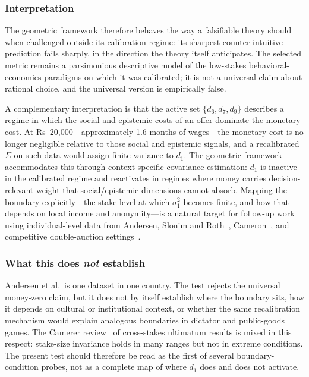 \documentclass[journal]{IEEEtran}
\begin{document}
\subsubsection{Interpretation}
The geometric framework therefore behaves the way a falsifiable theory should when challenged outside its calibration regime: its sharpest counter-intuitive prediction fails sharply, in the direction the theory itself anticipates.
The selected metric remains a parsimonious descriptive model of the low-stakes behavioral-economics paradigms on which it was calibrated; it is not a universal claim about rational choice, and the universal version is empirically false.

A complementary interpretation is that the active set $\{d_6,d_7,d_9\}$ describes a regime in which the social and epistemic costs of an offer dominate the monetary cost.
At Rs~20{,}000---approximately 1.6 months of wages---the monetary cost is no longer negligible relative to those social and epistemic signals, and a recalibrated $\Sigma$ on such data would assign finite variance to $d_1$.
The geometric framework accommodates this through context-specific covariance estimation: $d_1$ is inactive in the calibrated regime and reactivates in regimes where money carries decision-relevant weight that social/epistemic dimensions cannot absorb.
Mapping the boundary explicitly---the stake level at which $\sigma_1^2$ becomes finite, and how that depends on local income and anonymity---is a natural target for follow-up work using individual-level data from Andersen, Slonim and Roth~\cite{slonim1998}, Cameron~\cite{cameron1999}, and competitive double-auction settings~\cite{smith1962}.

\subsubsection{What this does \emph{not} establish}
Andersen et al.\ is one dataset in one country.
The test rejects the universal money-zero claim, but it does not by itself establish where the boundary sits, how it depends on cultural or institutional context, or whether the same recalibration mechanism would explain analogous boundaries in dictator and public-goods games.
The Camerer review~\cite{camerer2003} of cross-stakes ultimatum results is mixed in this respect: stake-size invariance holds in many ranges but not in extreme conditions.
The present test should therefore be read as the first of several boundary-condition probes, not as a complete map of where $d_1$ does and does not activate.
\end{document}
